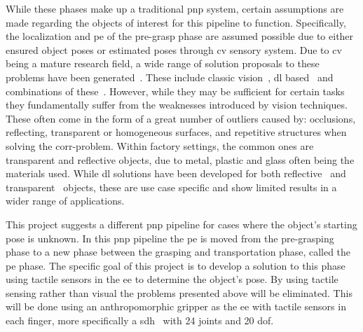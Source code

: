 While these phases make up a traditional \gls{pnp} system, certain assumptions are made regarding the objects of interest for this pipeline to function. Specifically, the localization and \gls{pe} of the pre-grasp phase are assumed possible due to either ensured object poses or estimated poses through \gls{cv} sensory system. Due to \gls{cv} being a mature research field, a wide range of solution proposals to these problems have been generated~\cite{6d-pose-estimation-of-objects:-recent-technologies-and-challenges}. These include classic vision~\cite{3d-object-pose-estimation-using-stereo-vision-for-object-manipulation-system, stereo-vision-based-automation-for-a-bin-picking-solution}, \gls{dl} based~\cite{uncalibrated-stereo-vision-with-deep-learning-for-6-dof-pose-estimation-for-a-robot-arm-system} and combinations of these~\cite{stereo-vision-based-single-shot-6d-object-pose-estimation-for-bin-picking-by-a-robot-manipulator}. However, while they may be sufficient for certain tasks they fundamentally suffer from the weaknesses introduced by vision techniques. These often come in the form of a great number of outliers caused by: occlusions, reflecting, transparent or homogeneous surfaces, and repetitive structures when solving the \gls{corr-problem}. Within factory settings, the common ones are transparent and reflective objects, due to metal, plastic and glass often being the materials used. While \gls{dl} solutions have been developed for both reflective~\cite{data-driven-object-pose-estimation-in-a-practical-bin-picking-application} and transparent~\cite{6dof-pose-estimation-of-transparent-object-from-a-single-rgb-d-image} objects, these are use case specific and show limited results in a wider range of applications. \medskip

This project suggests a different \gls{pnp} pipeline for cases where the object's starting pose is unknown. In this \gls{pnp} pipeline the \gls{pe} is moved from the pre-grasping phase to a new phase between the grasping and transportation phase, called the \gls{pe} phase. The specific goal of this project is to develop a solution to this phase using tactile sensors in the \gls{ee} to determine the object's pose. By using tactile sensing rather than visual the problems presented above will be eliminated. This will be done using an anthropomorphic gripper as the \gls{ee} with tactile sensors in each finger, more specifically a \gls{sdh}~\cite{shadow-dex-hand} with \num{24} joints and \num{20} \gls{dof}. \medskip

